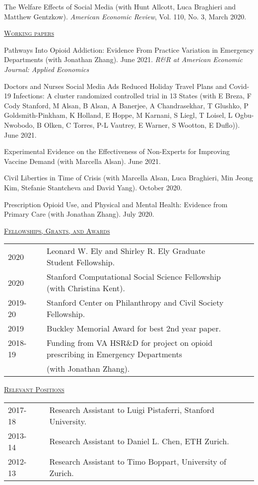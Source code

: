 \documentclass[letterpaper,11pt]{article}
\begin{document}
The Welfare Effects of Social Media (with Hunt Allcott, Luca Braghieri and Matthew Gentzkow). \textit{American Economic Review}, Vol. 110, No. 3, March 2020.

\bigskip

\underline {\textsc{Working papers}}

Pathways Into Opioid Addiction: Evidence From Practice Variation in Emergency Departments (with Jonathan Zhang). June 2021. \textit{R\&R at American Economic Journal: Applied Economics}

Doctors and Nurses Social Media Ads Reduced Holiday Travel Plans and Covid-19 Infections: A cluster randomized controlled trial in 13 States (with E Breza, F Cody Stanford, M Alsan, B Alsan, A Banerjee, A Chandrasekhar, T Glushko, P Goldsmith-Pinkham, K Holland, E Hoppe, M Karnani, S Liegl, T Loisel, L Ogbu-Nwobodo, B Olken, C Torres, P-L Vautrey, E Warner, S Wootton, E Duflo)). June 2021.

Experimental Evidence on the Effectiveness of Non-Experts for Improving Vaccine Demand (with Marcella Alsan). June 2021.

Civil Liberties in Time of Crisis (with Marcella Alsan, Luca Braghieri, Min Jeong Kim, Stefanie Stantcheva and David Yang). October 2020.

Prescription Opioid Use, and Physical and Mental Health: Evidence from Primary Care (with Jonathan Zhang). July 2020.

 
 \bigskip


\underline {\textsc{Fellowships, Grants, and Awards}}

\begin{tabular}{@{}l@{}cl@{}cl}
2020 & & Leonard W. Ely and Shirley R. Ely Graduate Student Fellowship. \\
2020 & & Stanford Computational Social Science Fellowship (with Christina Kent). \\
2019-20 & & Stanford Center on Philanthropy and Civil Society Fellowship. \\
2019 & & Buckley Memorial Award for best 2nd year paper. \\
2018-19 & & Funding from VA HSR\&D for project on opioid prescribing in Emergency Departments \\ & & (with Jonathan Zhang).
\end{tabular}
  \newpage
 \bigskip
 
\underline {\textsc{Relevant Positions}}

\begin{tabular}{@{}l@{}cl@{}cl}
2017-18 & & Research Assistant to Luigi Pistaferri, Stanford University. \\
2013-14 & & Research Assistant to Daniel L. Chen, ETH Zurich. \\
2012-13 & & Research Assistant to Timo Boppart, University of Zurich.
\end{tabular}
\end{document}
